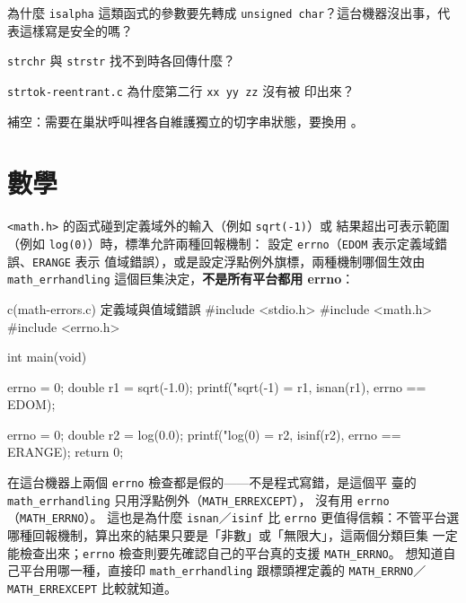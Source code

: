 
\begin{drills}[label=drills:sl-charstring]
\item 為什麼 \texttt{isalpha} 這類函式的參數要先轉成
\texttt{unsigned char}？這台機器沒出事，代表這樣寫是安全的嗎？
\item \texttt{strchr} 與 \texttt{strstr} 找不到時各回傳什麼？
\item \texttt{strtok-reentrant.c} 為什麼第二行 \texttt{xx yy zz} 沒有被
印出來？
\item 補空：需要在巢狀呼叫裡各自維護獨立的切字串狀態，要換用
\underline{\hspace{2em}}。
\end{drills}

\section{數學}
\label{sec:sl-math}

\texttt{<math.h>} 的函式碰到定義域外的輸入（例如 \texttt{sqrt(-1)}）或
結果超出可表示範圍（例如 \texttt{log(0)}）時，標準允許兩種回報機制：
設定 \texttt{errno}（\texttt{EDOM} 表示定義域錯誤、\texttt{ERANGE} 表示
值域錯誤），或是設定浮點例外旗標，兩種機制哪個生效由
\texttt{math\_errhandling} 這個巨集決定，\textbf{不是所有平台都用
errno}：

\begin{example}{c}{(math-errors.c) 定義域與值域錯誤}
#include <stdio.h>
#include <math.h>
#include <errno.h>

int main(void) {
    errno = 0;
    double r1 = sqrt(-1.0);
    printf("sqrt(-1) = %
           r1, isnan(r1), errno == EDOM);

    errno = 0;
    double r2 = log(0.0);
    printf("log(0) = %
           r2, isinf(r2), errno == ERANGE);
    return 0;
}
\end{example}


在這台機器上兩個 \texttt{errno} 檢查都是假的——不是程式寫錯，是這個平
臺的 \texttt{math\_errhandling} 只用浮點例外（\texttt{MATH\_ERREXCEPT}），
沒有用 \texttt{errno}（\texttt{MATH\_ERRNO}）。 這也是為什麼
\texttt{isnan}／\texttt{isinf} 比 \texttt{errno} 更值得信賴：不管平台選
哪種回報機制，算出來的結果只要是「非數」或「無限大」，這兩個分類巨集
一定能檢查出來；\texttt{errno} 檢查則要先確認自己的平台真的支援
\texttt{MATH\_ERRNO}。 想知道自己平台用哪一種，直接印
\texttt{math\_errhandling} 跟標頭裡定義的 \texttt{MATH\_ERRNO}／
\texttt{MATH\_ERREXCEPT} 比較就知道。


